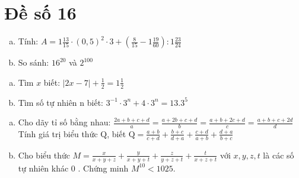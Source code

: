 \onehalfspacing
\section{Đề số 16}
\graphicspath{{./img/}}
\begin{bt} 
    \hfill
	\begin{enumerate}[a.]
		\item Tính: $A=1 \frac{13}{15} \cdot(0,5)^2 \cdot 3+\left(\frac{8}{15}-1 \frac{19}{60}\right): 1 \frac{23}{24}$
        \item So sánh: $16^{20}$ và $2^{100}$
	\end{enumerate}
	\loigiai{} 
\end{bt}

\begin{bt}
	\hfill
	\begin{enumerate}[a.]
		\item Tìm $x$ biết: $|2 x-7|+\frac{1}{2}=1 \frac{1}{2}$
        \item Tìm số tự nhiên $\mathrm{n}$ biết: $3^{-1} \cdot 3^n+4 \cdot 3^n=13.3^5$
	\end{enumerate}
	\loigiai{} 
\end{bt}

\begin{bt}
	\hfill
	\begin{enumerate}[a.]
		\item Cho dãy tỉ số bằng nhau: $\frac{2 a+b+c+d}{a}=\frac{a+2 b+c+d}{b}=\frac{a+b+2 c+d}{c}=\frac{a+b+c+2 d}{d}$ Tính giá trị biểu thức $\mathrm{Q}$, biết $\mathrm{Q}=\frac{a+b}{c+d}+\frac{b+c}{d+a}+\frac{c+d}{a+b}+\frac{d+a}{b+c}$
        \item Cho biểu thức $M=\frac{x}{x+y+z}+\frac{y}{x+y+t}+\frac{z}{y+z+t}+\frac{t}{x+z+t}$ với $x, y, z, t$ là các số tự nhiên khác 0 . Chứng minh $M^{10}<1025$.
    \end{enumerate}
	\loigiai{}
\end{bt}

